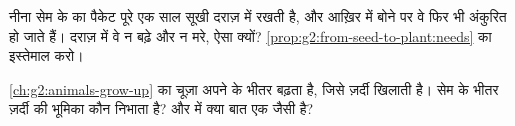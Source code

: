 \begin{exercise}[$\star\star$]\label{exo:g2:from-seed-to-plant:9}
नीना सेम के  का पैकेट पूरे एक साल सूखी दराज़ में रखती है, और
आख़िर में बोने पर वे फिर भी अंकुरित हो जाते हैं। दराज़ में वे न बढ़े
और न मरे, ऐसा क्यों? \cref{prop:g2:from-seed-to-plant:needs} का
इस्तेमाल करो।
\end{exercise}

\begin{exercise}[$\star\star$]\label{exo:g2:from-seed-to-plant:10}
\cref{ch:g2:animals-grow-up} का चूज़ा अपने  के भीतर बढ़ता है,
जिसे ज़र्दी खिलाती है। सेम के भीतर ज़र्दी की भूमिका कौन निभाता है?
 और  में क्या बात एक जैसी है?
\end{exercise}
